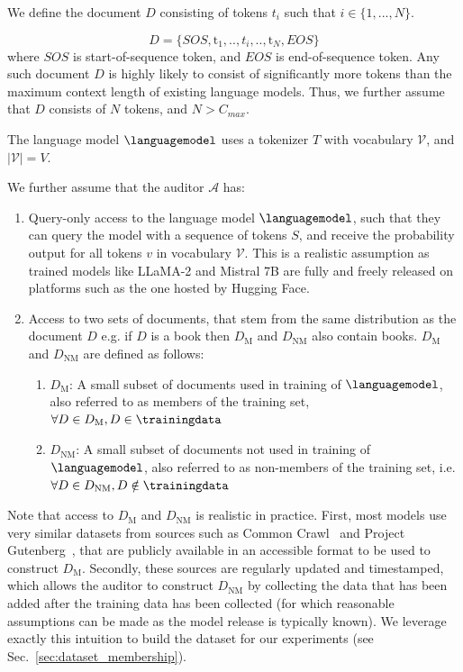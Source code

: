 \documentclass[twocolumn,10pt]{article}
\begin{document}
We define the document $D$ consisting of tokens $t_i$ such that $i \in \{1,...,N\}$.

\begin{equation}
    D = \{SOS, \text{t}_1,.., t_i, ..,\text{t}_N, EOS\}
\end{equation}
where $SOS$ is start-of-sequence token, and $EOS$ is end-of-sequence token. Any such document $D$ is highly likely to consist of significantly more tokens than the maximum context length of existing language models. Thus, we further assume that $D$ consists of $N$ tokens, and $N > C_{max}$.

The language model $\languagemodel$ uses a tokenizer $T$ with vocabulary $\mathcal{V}$, and $|\mathcal{V}| = V$.

We further assume that the auditor $\mathcal{A}$ has:

\begin{enumerate}
    \item Query-only access to the language model $\languagemodel$, such that they can query the model with a sequence of tokens $S$, and receive the probability output for all tokens $v$ in vocabulary $\mathcal{V}$. This is a realistic assumption as trained models like LLaMA-2 \cite{touvron2023llama2} and Mistral 7B \cite{jiang2023mistral}  are fully and freely released on platforms such as the one hosted by Hugging Face.
    \item Access to two sets of documents, that stem from the same distribution as the document $D$ e.g. if $D$ is a book then  $D_{\text{M}}$ and $D_{\text{NM}}$ also contain books. $D_{\text{M}}$ and $D_{\text{NM}}$ are defined as follows:
        \begin{enumerate}
            \item $D_{\text{M}}$: A small subset of documents used in training of $\languagemodel$, also referred to as members of the training set, 
            $\forall D \in D_{\text{M}}, D \in \trainingdata$
            \item $D_{\text{NM}}$: A small subset of documents not used in training of $\languagemodel$, also referred to as non-members of the training set, i.e. 
$\forall D \in D_{\text{NM}}, D \notin \trainingdata$
        \end{enumerate}
\end{enumerate}

Note that access to $D_{\text{M}}$ and $D_{\text{NM}}$ is realistic in practice. First, most models use very similar datasets from sources such as Common Crawl~\cite{commoncrawl} and Project Gutenberg~\cite{projectgutenberg}, that are publicly available in an accessible format to be used to construct $D_{\text{M}}$. Secondly, these sources are regularly updated and timestamped, which allows the auditor to construct $D_{\text{NM}}$ by collecting the data that has been added after the training data has been collected (for which reasonable assumptions can be made as the model release is typically known). We leverage exactly this intuition to build the dataset for our experiments (see Sec.~\ref{sec:dataset_membership}).
\end{document}
